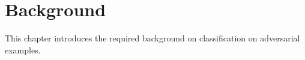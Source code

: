 \chapter{Background}
\label{chap:background}
This chapter introduces the required  background on classification on adversarial examples.
\minitoc




